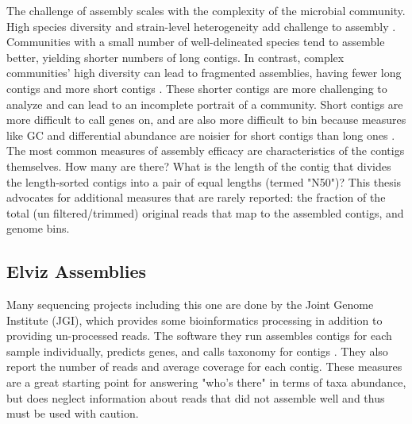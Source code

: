 The challenge of assembly scales with the complexity of the microbial community.
High species diversity and strain-level heterogeneity add challenge to assembly \cite{kunin2008, thomas2012}.
Communities with a small number of well-delineated species tend to assemble better, yielding shorter numbers of long contigs.
In contrast, complex communities' high diversity can lead to fragmented assemblies, having fewer long contigs and more short contigs \cite{kunin2008}.
These shorter contigs are more challenging to analyze and can lead to an incomplete portrait of a community.
Short contigs are more difficult to call genes on, and are also more difficult to bin because measures like GC and differential abundance are noisier for short contigs than long ones \cite{sangwan2016}.
The most common measures of assembly efficacy are characteristics of the contigs themselves.  How many are there?  What is the length of the contig that divides the length-sorted contigs into a pair of equal lengths (termed "N50")?
This thesis advocates for additional measures that are rarely reported: the fraction of the total (un filtered/trimmed) original reads that map to the assembled contigs, and genome bins.   %

\subsection{Elviz Assemblies}
Many sequencing projects including this one are done by the Joint Genome Institute (JGI), which provides some bioinformatics processing in addition to providing un-processed reads.
The software they run assembles contigs for each sample individually, predicts genes, and calls taxonomy for contigs \cite{cantor2015}.
They also report the number of reads and average coverage for each contig.
These measures are a great starting point for answering "who's there" in terms of taxa abundance, but does neglect information about reads that did not assemble well and thus must be used with caution.


